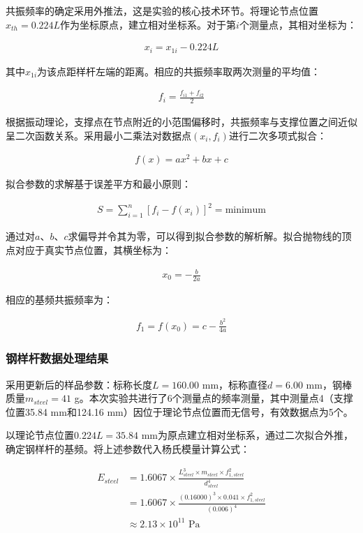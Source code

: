 ﻿\documentclass[12pt,a4paper]{article}
\begin{document}
共振频率的确定采用外推法，这是实验的核心技术环节。将理论节点位置$x_{th} = 0.224L$作为坐标原点，建立相对坐标系。对于第$i$个测量点，其相对坐标为：

\begin{align}
x_i = x_{1i} - 0.224L \tag{9}
\end{align}

其中$x_{1i}$为该点距样杆左端的距离。相应的共振频率取两次测量的平均值：

\begin{align}
f_i = \frac{f_{i1} + f_{i2}}{2} \tag{10}
\end{align}

根据振动理论，支撑点在节点附近的小范围偏移时，共振频率与支撑位置之间近似呈二次函数关系。采用最小二乘法对数据点$(x_i, f_i)$进行二次多项式拟合：

\begin{align}
f(x) = ax^2 + bx + c \tag{11}
\end{align}

拟合参数的求解基于误差平方和最小原则：

\begin{align}
S = \sum_{i=1}^{n}[f_i - f(x_i)]^2 = \text{minimum} \tag{12}
\end{align}

通过对$a$、$b$、$c$求偏导并令其为零，可以得到拟合参数的解析解。拟合抛物线的顶点对应于真实节点位置，其横坐标为：

\begin{align}
x_0 = -\frac{b}{2a} \tag{13}
\end{align}

相应的基频共振频率为：

\begin{align}
f_1 = f(x_0) = c - \frac{b^2}{4a} \tag{14}
\end{align}

\subsubsection{钢样杆数据处理结果}

采用更新后的样品参数：标称长度$L = 160.00$ mm，标称直径$d = 6.00$ mm，钢棒质量$m_{steel} = 41$ g。本次实验共进行了6个测量点的频率测量，其中测量点4（支撑位置35.84 mm和124.16 mm）因位于理论节点位置而无信号，有效数据点为5个。

以理论节点位置$0.224L = 35.84$ mm为原点建立相对坐标系，通过二次拟合外推，确定钢样杆的基频。将上述参数代入杨氏模量计算公式：

\begin{align}
E_{steel} &= 1.6067 \times \frac{L_{steel}^3 \times m_{steel} \times f_{1,steel}^2}{d_{steel}^4} \tag{15}\\
&= 1.6067 \times \frac{(0.16000)^3 \times 0.041 \times f_{1,steel}^2}{(0.006)^4} \tag{16}\\
&\approx 2.13 \times 10^{11} \text{ Pa} \tag{17}
\end{align}
\end{document}
